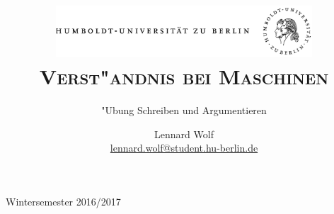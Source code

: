\documentclass[a4paper, emulatestandardclasses, 12pt]{scrartcl}
\date{\vspace{-3ex}}
\begin{document}
\title{\vspace{5ex}
	\includegraphics*[width=0.72\textwidth]{images/hu_logo.png}\\
	\vspace{30pt}
	\scshape\LARGE{Verst"andnis bei Maschinen}}
	
	\subtitle{\vspace{20pt}"Ubung Schreiben und Argumentieren\\
          }

\author{\vspace{-4pt}Lennard Wolf\\
        \small{\href{mailto:lennard.wolf@student.hu-berlin.de}{lennard.wolf@student.hu-berlin.de}}}      

\maketitle

\vspace{\fill}

\begin{minipage}[b]{\textwidth}
    \centering
    \onehalfspacing
    \large   
    Wintersemester 2016/2017

    \vspace{-20mm} 
\end{minipage}%
\thispagestyle{empty}
\newpage
\clearpage
\setcounter{page}{1}
\end{document}
